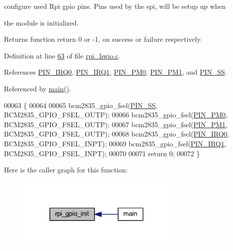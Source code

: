  

configure used Rpi gpio pins. Pins used by the spi, will be setup up when \par
 the module is initialized.

\begin{DoxyReturn}{Returns}
function return 0 or -\/1, on success or failure respectively. 

 
\end{DoxyReturn}


Definition at line \hyperlink{a00037_source_l00063}{63} of file \hyperlink{a00037_source}{rpi\-\_\-hwio.\-c}.



References \hyperlink{a00038_source_l00015}{P\-I\-N\-\_\-\-I\-R\-Q0}, \hyperlink{a00038_source_l00016}{P\-I\-N\-\_\-\-I\-R\-Q1}, \hyperlink{a00038_source_l00013}{P\-I\-N\-\_\-\-P\-M0}, \hyperlink{a00038_source_l00014}{P\-I\-N\-\_\-\-P\-M1}, and \hyperlink{a00038_source_l00010}{P\-I\-N\-\_\-\-S\-S}.



Referenced by \hyperlink{a00034_source_l00198}{main()}.


\begin{DoxyCode}
00063                           \{
00064     
00065         bcm2835\_gpio\_fsel(\hyperlink{a00038_ab4b553591a495409d4f7cec4b6c3e754}{PIN\_SS},  BCM2835\_GPIO\_FSEL\_OUTP);
00066         bcm2835\_gpio\_fsel(\hyperlink{a00038_aef7884a448449013ba1f8b46b8df5c05}{PIN\_PM0},  BCM2835\_GPIO\_FSEL\_OUTP);
00067         bcm2835\_gpio\_fsel(\hyperlink{a00038_a93e6f13f663a3ca8bcf6efe2022c9b78}{PIN\_PM1},  BCM2835\_GPIO\_FSEL\_OUTP);
00068         bcm2835\_gpio\_fsel(\hyperlink{a00038_a99ed780c4dd8d2e01c5ff66064306abf}{PIN\_IRQ0}, BCM2835\_GPIO\_FSEL\_INPT);
00069         bcm2835\_gpio\_fsel(\hyperlink{a00038_a14204df3192ece77fc1b651c6625bc30}{PIN\_IRQ1}, BCM2835\_GPIO\_FSEL\_INPT);
00070             
00071 \textcolor{keywordflow}{return} 0;   
00072 \}
\end{DoxyCode}


Here is the caller graph for this function\-:\nopagebreak
\begin{figure}[H]
\begin{center}
\leavevmode
\includegraphics[width=222pt]{d0/d0b/a00004_ga156b48448f55534a2f9c805a1f760efa_icgraph}
\end{center}
\end{figure}


